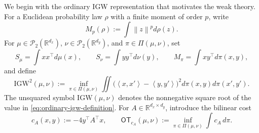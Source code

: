\documentclass[11pt]{article}
\newcommand{\R}{\mathbb R}
\newcommand{\cP}{\mathcal P}
\newcommand{\ip}[2]{\left\langle #1,#2\right\rangle}
\newcommand{\norm}[1]{\left\lVert #1\right\rVert}
\newcommand{\IGW}{\mathrm{IGW}}
\theoremstyle{plain}
\theoremstyle{definition}
\theoremstyle{remark}
\begin{document}
We begin with the ordinary IGW representation that motivates the weak theory.
For a Euclidean probability law $\rho$ with a finite moment of order $p$, write
\begin{equation}\label{eq:moment-notation}
 M_p(\rho):=\int\norm z^p d\rho(z).
\end{equation}
For
$\mu\in\cP_2(\R^{d_x})$, $\nu\in\cP_2(\R^{d_y})$, and
$\pi\in\Pi(\mu,\nu)$, set
\begin{equation}\label{eq:ordinary-igw-moment-notation}
 S_\mu=\int xx^\top d\mu(x),\qquad
 S_\nu=\int yy^\top d\nu(y),\qquad
 M_\pi=\int xy^\top d\pi(x,y),
\end{equation}
and define
\begin{equation}\label{eq:ordinary-igw-definition}
 \IGW^2(\mu,\nu)
 :=\inf_{\pi\in\Pi(\mu,\nu)}
 \iint\big(\ip{x}{x'}-\ip{y}{y'}\big)^2
 d\pi(x,y)d\pi(x',y').
\end{equation}
The unsquared symbol \(\IGW(\mu,\nu)\) denotes the nonnegative square root of
the value in \eqref{eq:ordinary-igw-definition}.
For $A\in\R^{d_x\times d_y}$, introduce the bilinear cost
\begin{equation}\label{eq:ordinary-igw-bilinear-cost}
 c_A(x,y):=-4y^\top A^\top x,
 \qquad
 \mathsf{OT}_{c_A}(\mu,\nu)
 :=\inf_{\pi\in\Pi(\mu,\nu)}\int c_A\,d\pi.
\end{equation}
\end{document}
